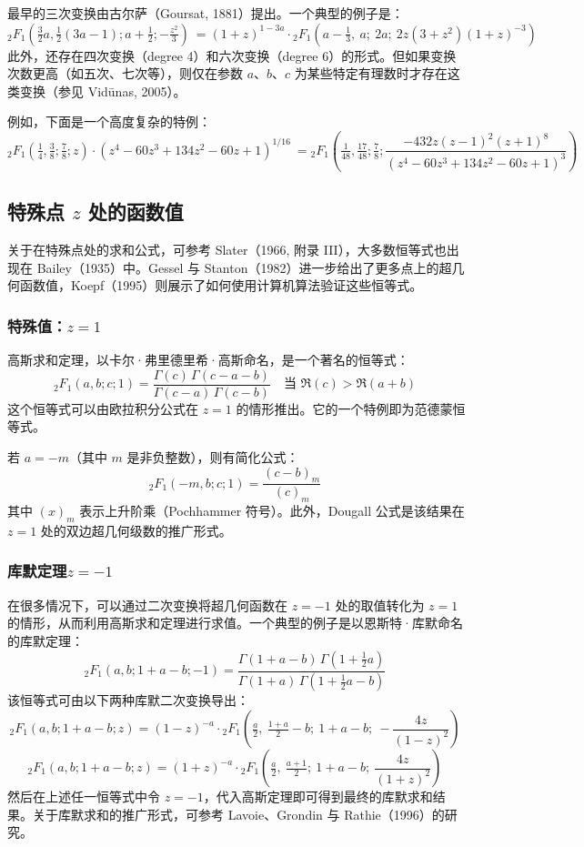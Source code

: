 最早的三次变换由古尔萨（Goursat, 1881）提出。一个典型的例子是：
$$
{}_2F_1\left(\tfrac{3}{2}a, \tfrac{1}{2}(3a - 1); a + \tfrac{1}{2}; -\tfrac{z^2}{3}\right)~
=
(1 + z)^{1 - 3a} \cdot {}_2F_1\left(a - \tfrac{1}{3},\ a;\ 2a;\ 2z(3 + z^2)(1 + z)^{-3} \right)~
$$
此外，还存在四次变换（degree 4）和六次变换（degree 6）的形式。但如果变换次数更高（如五次、七次等），则仅在参数 $a$、$b$、$c$ 为某些特定有理数时才存在这类变换（参见 Vidūnas, 2005）。

例如，下面是一个高度复杂的特例：
$$
{}_2F_1\left(\tfrac{1}{4}, \tfrac{3}{8}; \tfrac{7}{8}; z \right)
\cdot (z^4 - 60z^3 + 134z^2 - 60z + 1)^{1/16}~
=
{}_2F_1\left(\tfrac{1}{48}, \tfrac{17}{48}; \tfrac{7}{8}; \frac{-432z(z - 1)^2(z + 1)^8}{(z^4 - 60z^3 + 134z^2 - 60z + 1)^3} \right)~
$$
\subsection{特殊点 $z$ 处的函数值}
关于在特殊点处的求和公式，可参考 Slater（1966, 附录 III），大多数恒等式也出现在 Bailey（1935）中。Gessel 与 Stanton（1982）进一步给出了更多点上的超几何函数值，Koepf（1995）则展示了如何使用计算机算法验证这些恒等式。
\subsubsection{特殊值：$z = 1$}
高斯求和定理，以卡尔·弗里德里希·高斯命名，是一个著名的恒等式：
$$
{}_2F_1(a, b; c; 1) = \frac{\Gamma(c)\, \Gamma(c - a - b)}{\Gamma(c - a)\, \Gamma(c - b)} \quad \text{当 } \Re(c) > \Re(a + b)~
$$
这个恒等式可以由欧拉积分公式在 $z = 1$ 的情形推出。它的一个特例即为范德蒙恒等式。

若 $a = -m$（其中 $m$ 是非负整数），则有简化公式：
$$
{}_2F_1(-m, b; c; 1) = \frac{(c - b)_m}{(c)_m}~
$$
其中 $(x)_m$ 表示上升阶乘（Pochhammer 符号）。此外，Dougall 公式是该结果在 $z = 1$ 处的双边超几何级数的推广形式。
\subsubsection{库默定理$z = -1$}
在很多情况下，可以通过二次变换将超几何函数在 $z = -1$ 处的取值转化为 $z = 1$ 的情形，从而利用高斯求和定理进行求值。一个典型的例子是以恩斯特·库默命名的库默定理：
$$
{}_2F_1(a, b; 1 + a - b; -1) = \frac{\Gamma(1 + a - b)\, \Gamma\left(1 + \tfrac{1}{2}a\right)}{\Gamma(1 + a)\, \Gamma\left(1 + \tfrac{1}{2}a - b\right)}~
$$
该恒等式可由以下两种库默二次变换导出：
$$
{}_2F_1(a, b; 1 + a - b; z) =
(1 - z)^{-a} \cdot {}_2F_1\left( \tfrac{a}{2},\ \tfrac{1 + a}{2} - b;\ 1 + a - b;\ -\frac{4z}{(1 - z)^2} \right)~
$$
$$
{}_2F_1(a, b; 1 + a - b; z) =
(1 + z)^{-a} \cdot {}_2F_1\left( \tfrac{a}{2},\ \tfrac{a + 1}{2};\ 1 + a - b;\ \frac{4z}{(1 + z)^2} \right)~
$$
然后在上述任一恒等式中令 $z = -1$，代入高斯定理即可得到最终的库默求和结果。关于库默求和的推广形式，可参考 Lavoie、Grondin 与 Rathie（1996）的研究。
